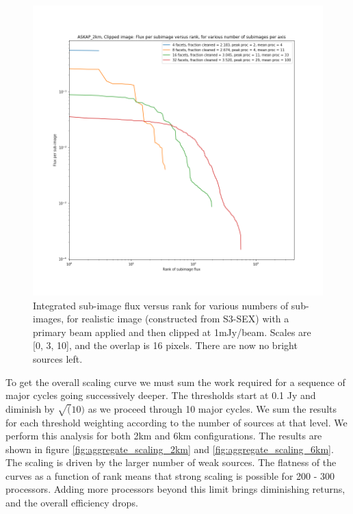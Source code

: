 \documentclass[11pt,a4paper,variablewidth]{article}
\begin{document}
\begin{figure}[H]
  \centering
  \includegraphics[width=\textwidth]{./fluxes_clipped_image_ASKAP_2km.png}
  \caption{Integrated sub-image flux versus rank for various numbers of sub-images, for realistic image (constructed from S3-SEX) with a primary beam applied and then clipped at 1mJy/beam. Scales are [0, 3, 10], and the overlap is 16 pixels. There are now no bright sources left.}
  \label{fig:fractions_clipped_image}
\end{figure}

To get the overall scaling curve we must sum the work required for a sequence of major cycles going successively deeper. The thresholds start at 0.1 Jy and diminish by $\sqrt(10)$ as we proceed through 10 major cycles. We sum the results for each threshold weighting according to the number of sources at that level. We perform this analysis for both 2km and 6km configurations. The results are shown in figure \ref{fig:aggregate_scaling_2km} and \ref{fig:aggregate_scaling_6km}. The scaling is driven by the larger number of weak sources. The flatness of the curves as a function of rank means that strong scaling is possible for 200 - 300 processors. Adding more processors beyond this limit brings diminishing returns, and the overall efficiency drops.
\end{document}
